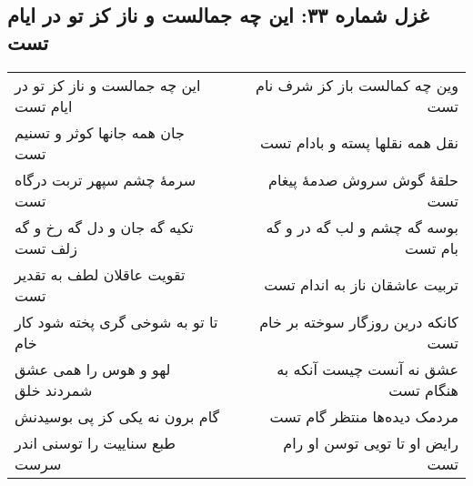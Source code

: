 \begin{center}
\section*{غزل شماره ۳۳: این چه جمالست و ناز کز تو در ایام تست}
\label{sec:033}
\begin{longtable}{l p{0.5cm} r}
این چه جمالست و ناز کز تو در ایام تست
&&
وین چه کمالست باز کز شرف نام تست
\\
جان همه جانها کوثر و تسنیم تست
&&
نقل همه نقلها پسته و بادام تست
\\
سرمهٔ چشم سپهر تربت درگاه تست
&&
حلقهٔ گوش سروش صدمهٔ پیغام تست
\\
تکیه گه جان و دل گه رخ و گه زلف تست
&&
بوسه گه چشم و لب گه در و گه بام تست
\\
تقویت عاقلان لطف به تقدیر تست
&&
تربیت عاشقان ناز به اندام تست
\\
تا تو به شوخی گری پخته شود کار خام
&&
کانکه درین روزگار سوخته بر خام تست
\\
لهو و هوس را همی عشق شمردند خلق
&&
عشق نه آنست چیست آنکه به هنگام تست
\\
گام برون نه یکی کز پی بوسیدنش
&&
مردمک دیده‌ها منتظر گام تست
\\
طبع سناییت را توسنی اندر سرست
&&
رایض او تا تویی توسن او رام تست
\\
\end{longtable}
\end{center}
